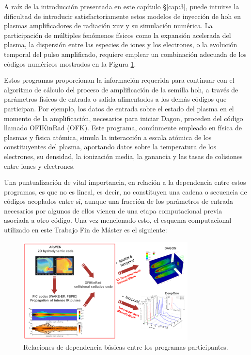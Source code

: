 A raíz de la introducción presentada en este capítulo \S\ref{cap:3}, puede intuirse la dificultad de introducir satisfactoriamente estos modelos de inyección de \acrshort{hoh} en plasmas amplificadores de radiación \acrshort{xuv} y su simulación numérica. La participación de múltiples fenómenos físicos como la expansión acelerada del plasma, la dispersión entre las especies de iones y los electrones, o la evolución temporal del pulso amplificado, requiere emplear un combinación adecuada de los códigos numéricos mostrados en la Figura \ref{fig:3.2}.

Estos programas proporcionan la información requerida para continuar con el algoritmo de cálculo del proceso de amplificación de la semilla \acrshort{hoh}, a través de parámetros físicos de entrada o salida alimentados a los demás códigos que participan. Por ejemplo, los datos de entrada sobre el estado del plasma en el momento de la amplificación, necesarios para iniciar Dagon, proceden del código llamado OFIKinRad (OFK). Este programa, comúnmente empleado en física de plasmas y física atómica, simula la interacción a escala atómica de los constituyentes del plasma, aportando datos sobre la temperatura de los electrones, su densidad, la ionización media, la ganancia y las tasas de colisiones entre iones y electrones. 

Una puntualización de vital importancia, en relación a la dependencia entre estos programas, es que no es lineal, es decir, no constituyen una cadena o secuencia de códigos acoplados entre sí, aunque una fracción de los parámetros de entrada necesarios por algunos de ellos vienen de una etapa computacional previa asociada a otro código. Una vez mencionado esto, el esquema computacional utilizado en este Trabajo Fin de Máster es el siguiente:

\begin{figure}[htbp]
  \centering
  \includegraphics[width=0.8\textwidth]{Figuras/ch3_codig.png}
  \caption{Relaciones de dependencia básicas entre los programas participantes. \autocite{Gil2021}}
  \label{fig:3.2}
\end{figure}

